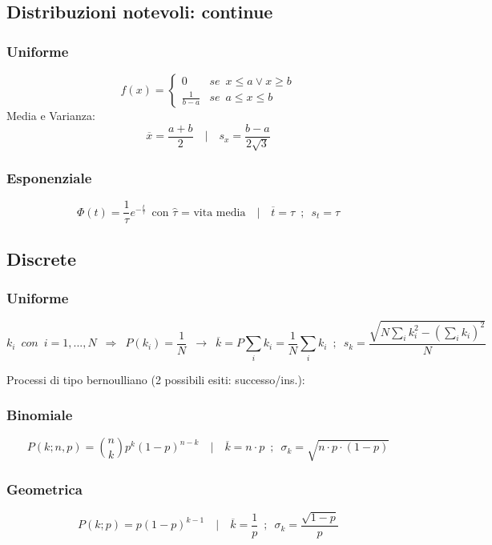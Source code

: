 \documentclass[11pt]{article}
\begin{document}
\subsection{Distribuzioni notevoli: continue}
\subsubsection*{Uniforme}
\[f(x) = \begin{cases}
    0 & se \enspace x \leq a \lor x \geq b\\
    \frac{1}{b-a} & se \enspace a \leq x \leq b
\end{cases}\]
Media e Varianza:
\[\overline{x} = \frac{a+b}{2} \quad \Bigg| \quad s_x = \frac{b - a}{2 \sqrt{3}}\]

\subsubsection*{Esponenziale}
\[\Phi (t) = \frac{1}{\tau} e^{-\frac{t}{\tau}} \enspace \textrm{con $\hat{\tau}$ = vita media} \quad \Bigg| \quad \overline{t} = \tau \enspace; \enspace s_t = \tau\]

\subsection{Discrete}
\subsubsection*{Uniforme}
\[k_i \enspace con \enspace i = 1, ..., N \enspace \Rightarrow \enspace P(k_i) = \frac{1}{N} \enspace \rightarrow \enspace \overline{k} = P \sum_i k_i = \frac{1}{N}\sum_i k_i \enspace; \enspace s_k = \frac{\sqrt{N \sum_i k_i^2 - (\sum_i k_i)^2}}{N}\]

Processi di tipo bernoulliano (2 possibili esiti: successo/ins.):

\subsubsection*{Binomiale}
\[P(k; n, p) = \binom{n}{k} p^k (1-p)^{n-k} \quad \Bigg| \quad \overline{k} = n \cdot p \enspace; \enspace \sigma_k = \sqrt{n \cdot p \cdot (1-p)}\]

\subsubsection*{Geometrica}
\[P(k; p) = p (1 - p)^{k-1} \quad \Bigg| \quad \overline{k} = \frac{1}{p} \enspace; \enspace \sigma_k = \frac{\sqrt{1-p}}{p}\]
\end{document}
